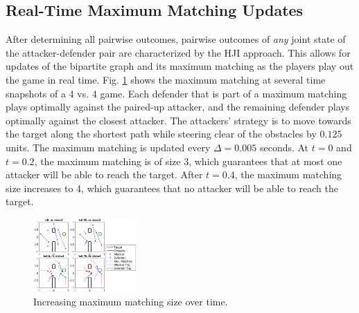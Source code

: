 \subsection{Real-Time Maximum Matching Updates}
After determining all pairwise outcomes, pairwise outcomes of \textit{any} joint state of the attacker-defender pair are characterized by the HJI approach. This allows for updates of the bipartite graph and its maximum matching as the players play out the game in real time. Fig. \ref{fig:real_time_update} shows the maximum matching at several time snapshots of a 4 vs. 4 game. Each defender that is part of a maximum matching plays optimally against the paired-up attacker, and the remaining defender plays optimally against the closest attacker. The attackers' strategy is to move towards the target along the shortest path while steering clear of the obstacles by $0.125$ units. The maximum matching is updated every $\Delta=0.005$ seconds. At $t=0$ and $t=0.2$, the maximum matching is of size 3, which guarantees that at most one attacker will be able to reach the target. After $t=0.4$, the maximum matching size increases to 4, which guarantees that no attacker will be able to reach the target.

\begin{figure}
	\centering
	\includegraphics[width=0.35\textwidth]{"fig/time varying graph"}
	\caption{Increasing maximum matching size over time.}
	\label{fig:real_time_update}
\end{figure}
